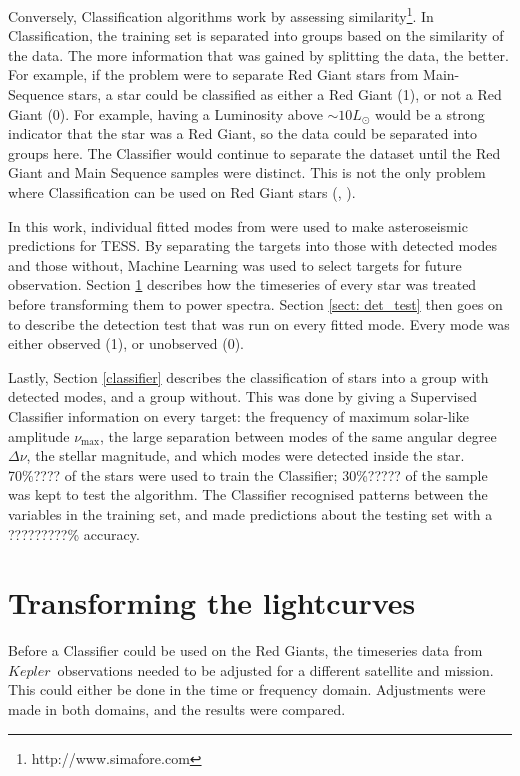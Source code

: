 \documentclass[a4paper,fleqn,usenatbib,useAMS]{mnras}
\newcommand{\numax}{\ensuremath{\nu_{\textrm{max}}}}
\newcommand{\dnu}{\ensuremath{\Delta\nu}}
\newcommand{\kep}{\ensuremath{Kepler}}
\begin{document}
Conversely, Classification algorithms work by assessing similarity\footnote{http://www.simafore.com}. In Classification, the training set is separated into groups based on the similarity of the data. The more information that was gained by splitting the data, the better. For example, if the problem were to separate Red Giant stars from Main-Sequence stars, a star could be classified as either a Red Giant (1), or not a Red Giant (0). For example, having a Luminosity above $\sim10L_{\odot}$ would be a strong indicator that the star was a Red Giant, so the data could be separated into groups here. The Classifier would continue to separate the dataset until the Red Giant and Main Sequence samples were distinct. This is not the only problem where Classification can be used on Red Giant stars (\citet{ness_cannon_2015}, \citet{wu_mass_2017}).

In this work, individual fitted modes from \citet{davies_asteroseismology_2016} were used to make asteroseismic predictions for TESS. By separating the targets into those with detected modes and those without, Machine Learning was used to select targets for future observation. Section \ref{sect: dataset} describes how the timeseries of every star was treated before transforming them to power spectra. Section \ref{sect: det_test} then goes on to describe the detection test that was run on every fitted mode. Every mode was either observed (1), or unobserved (0).

Lastly, Section \ref{classifier} describes the classification of stars into a group with detected modes, and a group without. This was done by giving a Supervised Classifier information on every target: the frequency of maximum solar-like amplitude \numax, the large separation between modes of the same angular degree \dnu, the stellar magnitude, and which modes were detected inside the star. 70\%???? of the stars were used to train the Classifier; 30\%????? of the sample was kept to test the algorithm. The Classifier recognised patterns between the variables in the training set, and made predictions about the testing set with a ?????????\% accuracy. 



\section{Transforming the lightcurves}
\label{sect: dataset}

Before a Classifier could be used on the Red Giants, the timeseries data from \kep \ observations needed to be adjusted for a different satellite and mission. This could either be done in the time or frequency domain. Adjustments were made in both domains, and the results were compared. %
\end{document}
